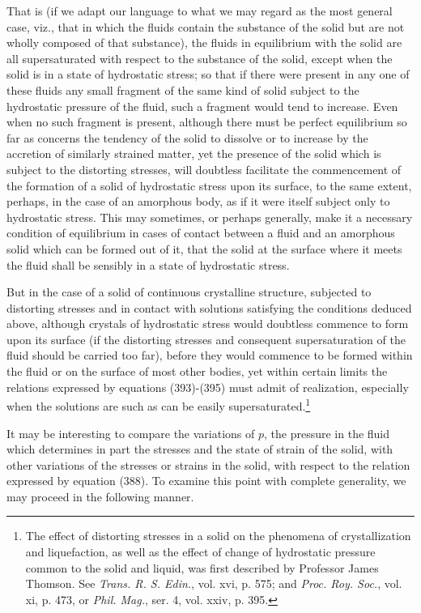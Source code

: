 \documentclass[12pt]{memoir}
\begin{document}
{That is (if we adapt our language to what we may regard as the most general case, viz., that in which the fluids contain the substance of the solid but are not wholly composed of that substance), the fluids in equilibrium with the solid are all supersaturated with respect to the substance of the solid, except when the solid is in a state of hydrostatic stress; so that if there were present in any one of these fluids any small fragment of the same kind of solid subject to the hydrostatic pressure of the fluid, such a fragment would tend to increase. Even when no such fragment is present, although there must be perfect equilibrium so far as concerns the tendency of the solid to dissolve or to increase by the accretion of similarly strained matter, yet the presence of the solid which is subject to the distorting stresses, will doubtless facilitate the commencement of the formation of a solid of hydrostatic stress upon its surface, to the same extent, perhaps, in the case of an amorphous body, as if it were itself subject only to hydrostatic stress. This may sometimes, or perhaps generally, make it a necessary condition of equilibrium in cases of contact between a fluid and an amorphous solid which can be formed out of it, that the solid at the surface where it meets the fluid shall be sensibly in a state of hydrostatic stress.


But in the case of a solid of continuous crystalline structure, subjected to distorting stresses and in contact with solutions satisfying the conditions deduced above, although crystals of hydrostatic stress would doubtless commence to form upon its surface (if the distorting stresses and consequent supersaturation of the fluid should be carried too far), before they would commence to be formed within the fluid or on the surface of most other bodies, yet within certain limits the relations expressed by equations (393)-(395) must admit of realization, especially when the solutions are such as can be easily supersaturated.\footnote{The effect of distorting stresses in a solid on the phenomena of crystallization and liquefaction, as well as the effect of change of hydrostatic pressure common to the solid and liquid, was first described by Professor James Thomson. See \textit{Trans. R. S. Edin.}, vol. xvi, p. 575; and \textit{Proc. Roy. Soc.}, vol. xi, p. 473, or \textit{Phil. Mag.}, ser. 4, vol. xxiv, p. 395.}


It may be interesting to compare the variations of $p$, the pressure in the fluid which determines in part the stresses and the state of strain of the solid, with other variations of the stresses or strains in the solid, with respect to the relation expressed by equation (388). To examine this point with complete generality, we may proceed in the following manner.


}
\end{document}
